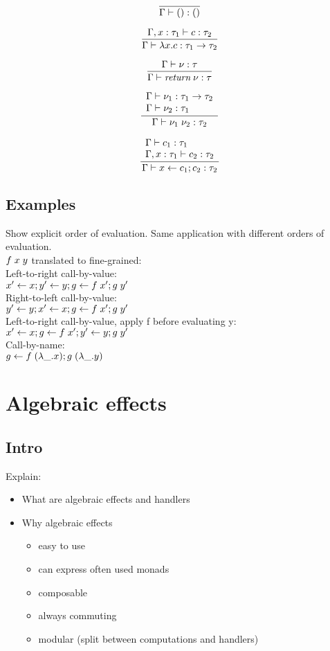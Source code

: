 {\[\frac{
}{
	\Gamma \vdash () : ()
}\]

\[\frac{
	\Gamma, x : \tau_1 \vdash c : \tau_2
}{
	\Gamma \vdash \lambda x . c : \tau_1 \rightarrow \tau_2
}\]

\[\frac{
	\Gamma \vdash \nu : \tau
}{
	\Gamma \vdash \textit{return} \; \nu : \tau
}\]

\[\frac{
	\begin{array}{l}
	\Gamma \vdash \nu_1 : \tau_1 \rightarrow \tau_2\\
	\Gamma \vdash \nu_2 : \tau_1
	\end{array}
}{
	\Gamma \vdash \nu_1 \; \nu_2 : \tau_2
}\]

\[\frac{
	\begin{array}{l}
	\Gamma \vdash c_1 : \tau_1\\
	\Gamma, x : \tau_1 \vdash c_2 : \tau_2
	\end{array}
}{
	\Gamma \vdash x \leftarrow c_1 ; c_2 : \tau_2
}\]

\subsection{Examples}
Show explicit order of evaluation.
Same application with different orders of evaluation.\\
$f \; x \; y$ translated to fine-grained:\\
Left-to-right call-by-value:\\
$x' \leftarrow x ; y' \leftarrow y ; g \leftarrow f \; x' ; g \; y' $\\
Right-to-left call-by-value:\\
$y' \leftarrow y ; x' \leftarrow x ; g \leftarrow f \; x' ; g \; y' $\\
Left-to-right call-by-value, apply f before evaluating y:\\
$x' \leftarrow x ; g \leftarrow f \; x' ; y' \leftarrow y ; g \; y' $\\
Call-by-name:\\
$g \leftarrow f \; (\lambda \_ . x) ; g \; (\lambda \_ . y)$

\newpage
\section{Algebraic effects}

\subsection{Intro}
Explain:
\begin{itemize}
	\item What are algebraic effects and handlers
	\item Why algebraic effects
	\begin{itemize}
		\item easy to use
		\item can express often used monads
		\item composable
		\item always commuting
		\item modular (split between computations and handlers)
	\end{itemize}
\end{itemize}

}
